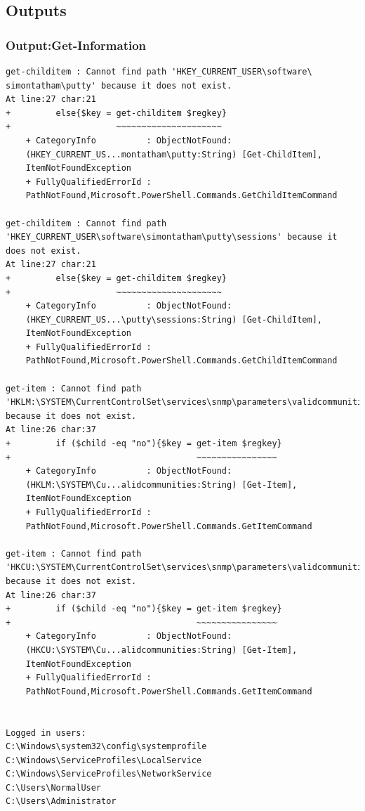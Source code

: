 \documentclass{article}%
\begin{document}
\subsection{Outputs}
\hypertarget{output1}{\subsubsection{Output:Get-Information}}
\begin{verbatim}
get-childitem : Cannot find path 'HKEY_CURRENT_USER\software\
simontatham\putty' because it does not exist.
At line:27 char:21
+         else{$key = get-childitem $regkey}
+                     ~~~~~~~~~~~~~~~~~~~~~
    + CategoryInfo          : ObjectNotFound: 
    (HKEY_CURRENT_US...montatham\putty:String) [Get-ChildItem],
    ItemNotFoundException
    + FullyQualifiedErrorId :
    PathNotFound,Microsoft.PowerShell.Commands.GetChildItemCommand
 
get-childitem : Cannot find path
'HKEY_CURRENT_USER\software\simontatham\putty\sessions' because it 
does not exist.
At line:27 char:21
+         else{$key = get-childitem $regkey}
+                     ~~~~~~~~~~~~~~~~~~~~~
    + CategoryInfo          : ObjectNotFound:
    (HKEY_CURRENT_US...\putty\sessions:String) [Get-ChildItem], 
    ItemNotFoundException
    + FullyQualifiedErrorId :
    PathNotFound,Microsoft.PowerShell.Commands.GetChildItemCommand
 
get-item : Cannot find path
'HKLM:\SYSTEM\CurrentControlSet\services\snmp\parameters\validcommunities' 
because it does not exist.
At line:26 char:37
+         if ($child -eq "no"){$key = get-item $regkey}
+                                     ~~~~~~~~~~~~~~~~
    + CategoryInfo          : ObjectNotFound:
    (HKLM:\SYSTEM\Cu...alidcommunities:String) [Get-Item], 
    ItemNotFoundException
    + FullyQualifiedErrorId :
    PathNotFound,Microsoft.PowerShell.Commands.GetItemCommand
 
get-item : Cannot find path
'HKCU:\SYSTEM\CurrentControlSet\services\snmp\parameters\validcommunities' 
because it does not exist.
At line:26 char:37
+         if ($child -eq "no"){$key = get-item $regkey}
+                                     ~~~~~~~~~~~~~~~~
    + CategoryInfo          : ObjectNotFound:
    (HKCU:\SYSTEM\Cu...alidcommunities:String) [Get-Item], 
    ItemNotFoundException
    + FullyQualifiedErrorId :
    PathNotFound,Microsoft.PowerShell.Commands.GetItemCommand
 

Logged in users:
C:\Windows\system32\config\systemprofile
C:\Windows\ServiceProfiles\LocalService
C:\Windows\ServiceProfiles\NetworkService
C:\Users\NormalUser
C:\Users\Administrator


\end{verbatim}
\end{document}
